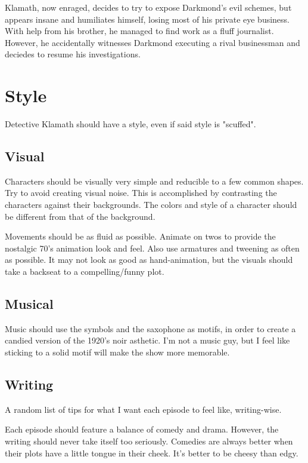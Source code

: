 \documentclass{article}
\begin{document}
Klamath, now enraged, decides to try to expose Darkmond's evil schemes, but appears insane and humiliates himself, losing most of his private eye business. With help from his brother, he managed to find work as a fluff journalist. However, he accidentally witnesses Darkmond executing a rival businessman and deciedes to resume his investigations.

\section{Style}

Detective Klamath should have a style, even if said style is "scuffed".

\subsection{Visual}

Characters should be visually very simple and reducible to a few common shapes. Try to avoid creating visual noise. This is accomplished by contrasting the characters against their backgrounds. The colors and style of a character should be different from that of the background.

Movements should be as fluid as possible. Animate on twos to provide the nostalgic 70's animation look and feel. Also use armatures and tweening as often as possible. It may not look as good as hand-animation, but the visuals should take a backseat to a compelling/funny plot.

\subsection{Musical}

Music should use the symbols and the saxophone as motifs, in order to create a candied version of the 1920's noir asthetic. I'm not a music guy, but I feel like sticking to a solid motif will make the show more memorable.

\subsection{Writing}

A random list of tips for what I want each episode to feel like, writing-wise.

Each episode should feature a balance of comedy and drama. However, the writing should never take itself too seriously. Comedies are always better when their plots have a little tongue in their cheek. It's better to be cheesy than edgy.
\end{document}
